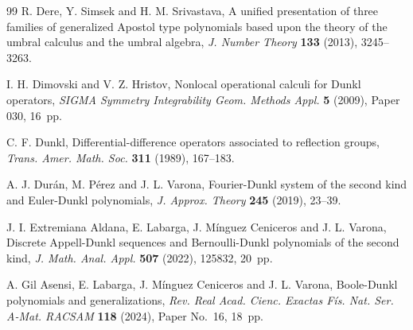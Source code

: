 \documentclass[11pt]{article}
\theoremstyle{plain}
\theoremstyle{remark}
\numberwithin{equation}{section} %
\begin{document}
\begin{thebibliography}{99}
R. Dere, Y. Simsek and H. M. Srivastava, 
A unified presentation of three families of generalized Apostol type polynomials based upon the theory of the umbral calculus and the umbral algebra,
\textit{J. Number Theory}
\textbf{133} (2013), 3245--3263. %



I. H. Dimovski and V. Z. Hristov,
Nonlocal operational calculi for Dunkl operators,
\textit{SIGMA Symmetry Integrability Geom. Methods Appl.}
\textbf{5} (2009), Paper 030, 16~pp.

C. F. Dunkl,
{Differential-difference operators associated to reflection groups},
\textit{Trans. Amer. Math. Soc.}
\textbf{311} (1989), 167--183.

A. J. Dur\'an, M. P\'erez and J. L. Varona,
Fourier-Dunkl system of the second kind and Euler-Dunkl polynomials,
\textit{J. Approx. Theory}
\textbf{245} (2019), 23--39.



J. I. Extremiana Aldana, E. Labarga, J. M\'inguez Ceniceros and J. L. Varona,
{Discrete Appell-Dunkl sequences and Bernoulli-Dunkl polynomials of the second kind},
\textit{J. Math. Anal. Appl.} 
\textbf{507} (2022), 125832, 20~pp. 

A. Gil Asensi, E. Labarga, J. M\'inguez Ceniceros and J. L. Varona,
{Boole-Dunkl polynomials and generalizations},
\textit{Rev. Real Acad. Cienc. Exactas F\'is. Nat. Ser. A-Mat. RACSAM} 
\textbf{118} (2024), Paper No.~16, 18~pp.



\end{thebibliography}
\end{document}
